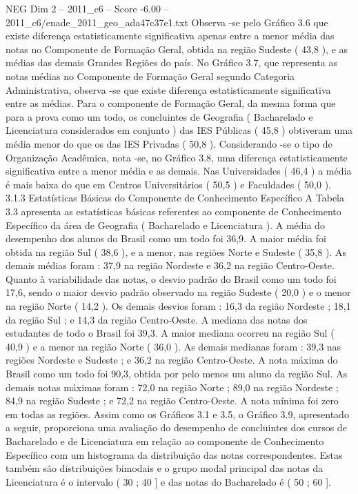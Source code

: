 \begin{textsample}{NEG Dim 2 – 2011\_c6 – Score -6.00 – 2011\_c6/enade\_2011\_geo\_ada47c37e1.txt}
Observa -se pelo Gráfico 3.6 que existe diferença estatisticamente significativa apenas entre a menor média das notas no Componente de Formação Geral, obtida na região Sudeste ( 43,8 ), e as médias das demais Grandes Regiões do país.
No Gráfico 3.7, que representa as notas médias no Componente de Formação Geral segundo Categoria Administrativa, observa -se que existe diferença estatisticamente significativa entre as médias.
Para o componente de Formação Geral, da mesma forma que para a prova como um todo, os concluintes de Geografia ( Bacharelado e Licenciatura considerados em conjunto ) das IES Públicas ( 45,8 ) obtiveram uma média menor do que os das IES Privadas ( 50,8 ).
Considerando -se o tipo de Organização Acadêmica, nota -se, no Gráfico 3.8, uma diferença estatisticamente significativa entre a menor média e as demais.
Nas Universidades ( 46,4 ) a média é mais baixa do que em Centros Universitários ( 50,5 ) e Faculdades ( 50,0 ). 3.1.3 Estatísticas Básicas do Componente de Conhecimento Específico A Tabela 3.3 apresenta as estatísticas básicas referentes ao componente de Conhecimento Específico da área de Geografia ( Bacharelado e Licenciatura ).
A média do desempenho dos alunos do Brasil como um todo foi 36,9.
A maior média foi obtida na região Sul ( 38,6 ), e a menor, nas regiões Norte e Sudeste ( 35,8 ).
As demais médias foram : 37,9 na região Nordeste e 36,2 na região Centro-Oeste.
Quanto à variabilidade das notas, o desvio padrão do Brasil como um todo foi 17,6, sendo o maior desvio padrão observado na região Sudeste ( 20,0 ) e o menor na região Norte ( 14,2 ).
Os demais desvios foram : 16,3 da região Nordeste ; 18,1 da região Sul ; e 14,3 da região Centro-Oeste.
A mediana das notas dos estudantes de todo o Brasil foi 39,3.
A maior mediana ocorreu na região Sul ( 40,9 ) e a menor na região Norte ( 36,0 ).
As demais medianas foram : 39,3 nas regiões Nordeste e Sudeste ; e 36,2 na região Centro-Oeste.
A nota máxima do Brasil como um todo foi 90,3, obtida por pelo menos um aluno da região Sul.
As demais notas máximas foram : 72,0 na região Norte ; 89,0 na região Nordeste ; 84,9 na região Sudeste ; e 72,2 na região Centro-Oeste.
A nota mínima foi zero em todas as regiões.
Assim como os Gráficos 3.1 e 3.5, o Gráfico 3.9, apresentado a seguir, proporciona uma avaliação do desempenho de concluintes dos cursos de Bacharelado e de Licenciatura em relação ao componente de Conhecimento Específico com um histograma da distribuição das notas correspondentes.
Estas também são distribuições bimodais e o grupo modal principal das notas da Licenciatura é o intervalo ( 30 ; 40 ] e das notas do Bacharelado é ( 50 ; 60 ].

\end{textsample}

